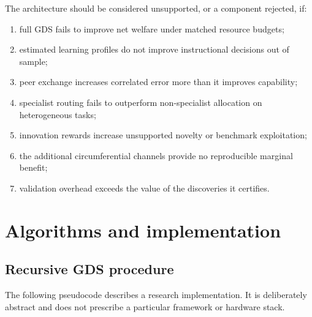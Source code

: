 \documentclass[11pt,a4paper]{article}
\begin{document}
The architecture should be considered unsupported, or a component rejected, if:
\begin{enumerate}
\item full GDS fails to improve net welfare under matched resource budgets;
\item estimated learning profiles do not improve instructional decisions out of sample;
\item peer exchange increases correlated error more than it improves capability;
\item specialist routing fails to outperform non-specialist allocation on heterogeneous tasks;
\item innovation rewards increase unsupported novelty or benchmark exploitation;
\item the additional circumferential channels provide no reproducible marginal benefit;
\item validation overhead exceeds the value of the discoveries it certifies.
\end{enumerate}

\section{Algorithms and implementation}

\subsection{Recursive GDS procedure}

The following pseudocode describes a research implementation. It is deliberately abstract and does not prescribe a particular framework or hardware stack.
\end{document}
